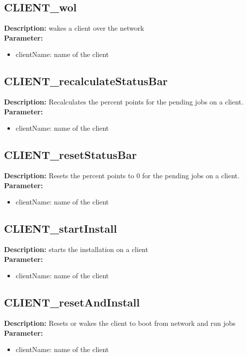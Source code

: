 \subsection{CLIENT\_wol}
\textbf{Description:} wakes a client over the network\\
\textbf{Parameter:}
\begin{itemize}
\item clientName: name of the client
\end{itemize}

\subsection{CLIENT\_recalculateStatusBar}
\textbf{Description:} Recalculates the percent points for the pending jobs on a client.\\
\textbf{Parameter:}
\begin{itemize}
\item clientName: name of the client
\end{itemize}

\subsection{CLIENT\_resetStatusBar}
\textbf{Description:} Resets the percent points to 0 for the pending jobs on a client.\\
\textbf{Parameter:}
\begin{itemize}
\item clientName: name of the client
\end{itemize}

\subsection{CLIENT\_startInstall}
\textbf{Description:} starts the installation on a client\\
\textbf{Parameter:}
\begin{itemize}
\item clientName: name of the client
\end{itemize}

\subsection{CLIENT\_resetAndInstall}
\textbf{Description:} Resets or wakes the client to boot from network and run jobs\\
\textbf{Parameter:}
\begin{itemize}
\item clientName: name of the client
\end{itemize}

